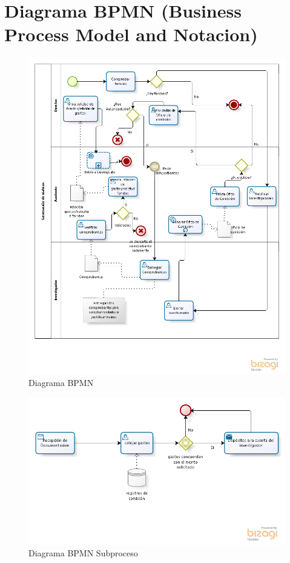 \documentclass{report}
\begin{document}
    \section{Diagrama BPMN (Business Process Model and Notacion)}
    
    	\begin{figure}[H]
    		\centering
    			\includegraphics[scale=0.80]{images/1models/comision.png}  
    			\caption{Diagrama BPMN}  		
    	\end{figure}
    	
    	\begin{figure}[H]
    		\centering
    			\includegraphics[scale=0.80]{images/1models/envioGto.png}
    			\caption{Diagrama BPMN Subproceso}
    	\end{figure}
    
\end{document}
